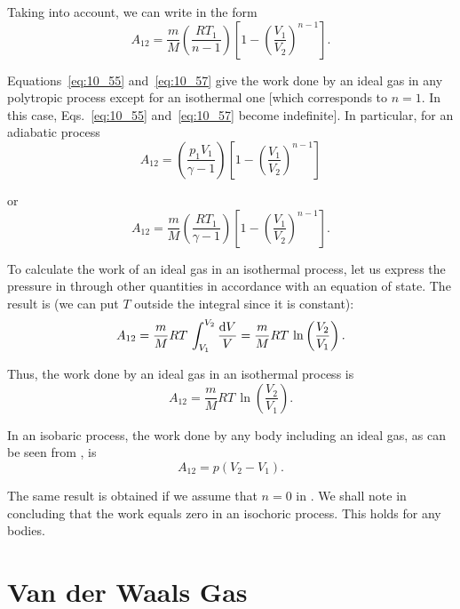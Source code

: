 \noindent
Taking  into account, we can write  in the form
\begin{equation}\label{eq:10_57}
	A_{12} = \frac{m}{M} \left(\frac{RT_1}{n-1}\right) \left[1 - \left(\frac{V_1}{V_2}\right)^{n-1} \right].
\end{equation}

Equations~\eqref{eq:10_55} and~\eqref{eq:10_57} give the work done by an ideal gas in any polytropic process except for an isothermal one [which corresponds to $n=1$. In this case, Eqs.~\eqref{eq:10_55} and~\eqref{eq:10_57} become indefinite]. In particular, for an adiabatic process
\begin{equation}\label{eq:10_58}
	A_{12} = \left(\frac{p_1 V_1}{\gamma - 1}\right) \left[1 - \left(\frac{V_1}{V_2}\right)^{n-1} \right]
\end{equation}

\noindent
or
\begin{equation}\label{eq:10_59}
	A_{12} = \frac{m}{M} \left(\frac{RT_1}{\gamma - 1}\right) \left[1 - \left(\frac{V_1}{V_2}\right)^{n-1} \right].
\end{equation}

To calculate the work of an ideal gas in an isothermal process, let us express the pressure in  through other quantities in accordance with an equation of state. The result is (we can put $T$ outside the integral since it is constant):
\begin{equation*}
	A_{12} = \frac{m}{M}RT\, \int_{V_1}^{V_2} \frac{\mathrm{d} V}{V} = \frac{m}{M} RT\,\ln\left(\frac{V_2}{V_1}\right).
\end{equation*}

\noindent
Thus, the work done by an ideal gas in an isothermal process is
\begin{equation}\label{eq:10_60}
	A_{12} = \frac{m}{M} RT\,\ln\left(\frac{V_2}{V_1}\right).
\end{equation}

In an isobaric process, the work done by any body including an ideal gas, as can be seen from , is
\begin{equation}\label{eq:10_61}
	A_{12} = p(V_2 - V_1).
\end{equation}

\noindent
The same result is obtained if we assume that $n=0$ in . We shall note in concluding that the work equals zero in an isochoric process. This holds for any bodies.

\section{Van der Waals Gas}\label{sec:10_13}

